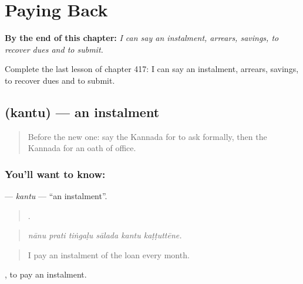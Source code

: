 
\chapter{Paying Back}
\label{ch:ka-paying-back}

\begin{chapteropening}
\textbf{By the end of this chapter:} \emph{I can say an instalment, arrears, savings, to recover dues and to submit.}

Complete the last lesson of chapter 417: I can say an instalment, arrears, savings, to recover dues and to submit.
\end{chapteropening}

\section[\texorpdfstring{\kn{ಕಂತು} (kantu)}{ಕಂತು (kantu)}]{ (kantu) — an instalment}

\label{lesson:KA-C417-kantu}



\begin{quote}
Before the new one: say the Kannada for to ask formally, then the Kannada for an oath of office.
\end{quote}

\subsection*{You'll want to know: }
\textbf{} — \emph{kantu} — \textquotedblleft{}an instalment\textquotedblright{}.

\begin{quote}
     .
\end{quote}

\begin{quote}
\emph{nānu prati tiṅgaḷu sālada kantu kaṭṭuttēne.}
\end{quote}

\begin{quote}
I pay an instalment of the loan every month.
\end{quote}

 , to pay an instalment.

